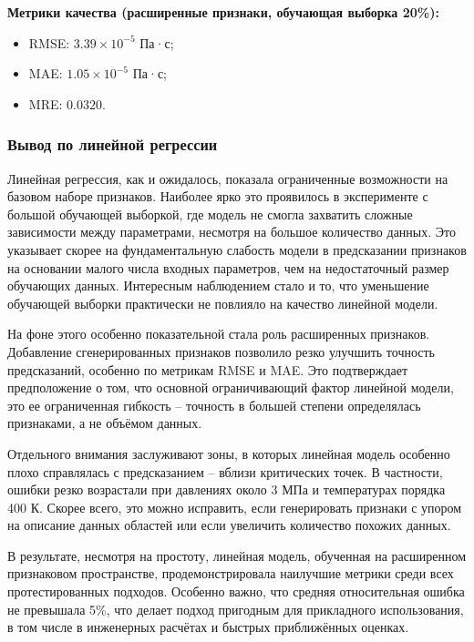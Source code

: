 \documentclass[a4paper,12pt]{article}
\begin{document}
    \begin{minipage}{\textwidth}
      \textbf{Метрики качества (расширенные признаки, обучающая выборка 20\%):}
      \begin{itemize}
          \item RMSE: \( 3.39 \times 10^{-5} \) Па·с;
          \item MAE: \( 1.05 \times 10^{-5} \) Па·с;
          \item MRE: \( 0.0320 \).
      \end{itemize}
    \end{minipage}

    \subsubsection{Вывод по линейной регрессии}

      Линейная регрессия, как и ожидалось, показала ограниченные возможности на базовом наборе признаков. Наиболее ярко это проявилось в эксперименте с большой обучающей выборкой, где модель не смогла захватить сложные зависимости между параметрами, несмотря на большое количество данных. Это указывает скорее на фундаментальную слабость модели в предсказании признаков на основании малого числа входных параметров, чем на недостаточный размер обучающих данных. Интересным наблюдением стало и то, что уменьшение обучающей выборки практически не повлияло на качество линейной модели.

      На фоне этого особенно показательной стала роль расширенных признаков. Добавление сгенерированных признаков позволило резко улучшить точность предсказаний, особенно по метрикам RMSE и MAE. Это подтверждает предположение о том, что основной ограничивающий фактор линейной модели, это ее ограниченная гибкость -- точность в большей степени определялась признаками, а не объёмом данных.
      
      Отдельного внимания заслуживают зоны, в которых линейная модель особенно плохо справлялась с предсказанием -- вблизи критических точек. В частности, ошибки резко возрастали при давлениях около 3 МПа и температурах порядка 400 К. Скорее всего, это можно исправить, если генерировать признаки с упором на описание данных областей или если увеличить количество похожих данных.
      
      В результате, несмотря на простоту, линейная модель, обученная на расширенном признаковом пространстве, продемонстрировала наилучшие метрики среди всех протестированных подходов. Особенно важно, что средняя относительная ошибка не превышала 5\%, что делает подход пригодным для прикладного использования, в том числе в инженерных расчётах и быстрых приближённых оценках.
\end{document}
